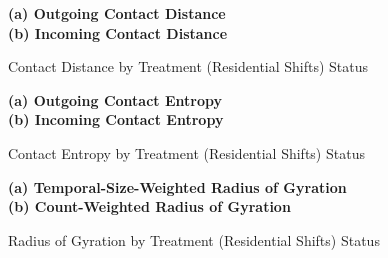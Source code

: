 \begin{figure}[ht!]
\centering
\caption{Contact Distance by Treatment (Residential Shifts) Status}
\vspace{0.3cm}

\textbf{(a) Outgoing Contact Distance}\\


\vspace{0.3cm}
\textbf{(b) Incoming Contact Distance}\\


\label{fig:effect_of_residential_shift_on_incoming_contact_distance}
\end{figure}


\begin{figure}[ht!]
\centering
\caption{Contact Entropy by Treatment (Residential Shifts) Status}
\vspace{0.3cm}

\textbf{(a) Outgoing Contact Entropy}\\



\vspace{0.3cm}
\textbf{(b) Incoming Contact Entropy}\\


\label{fig:effect_of_residential_shift_on_outgoing_incoming_social_entropy}
\end{figure}



\begin{figure}[ht!]
\centering
\caption{Radius of Gyration by Treatment (Residential Shifts) Status}
\vspace{0.3cm}

\textbf{(a) Temporal-Size-Weighted Radius of Gyration}\\


\vspace{0.3cm}
\textbf{(b) Count-Weighted Radius of Gyration}\\


\label{fig:effect_of_residential_shift_on_temporal_size_weighted_count_weighted_radius_of_gyration}
\end{figure}



